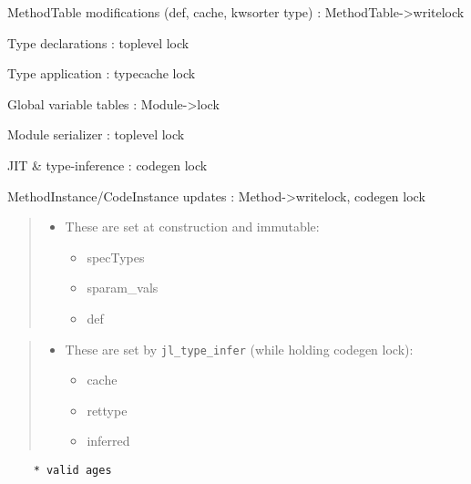 MethodTable modifications (def, cache, kwsorter type) : MethodTable->writelock



Type declarations : toplevel lock



Type application : typecache lock



Global variable tables : Module->lock



Module serializer : toplevel lock



JIT \& type-inference : codegen lock



MethodInstance/CodeInstance updates : Method->writelock, codegen lock



\begin{quote}
\begin{itemize}
\item These are set at construction and immutable:

\begin{itemize}
\item specTypes


\item sparam\_vals


\item def

\end{itemize}
\end{itemize}
\end{quote}


\begin{quote}
\begin{itemize}
\item These are set by \texttt{jl\_type\_infer} (while holding codegen lock):

\begin{itemize}
\item cache


\item rettype


\item inferred

\end{itemize}
\end{itemize}
\end{quote}



\begin{lstlisting}
    * valid ages
\end{lstlisting}



